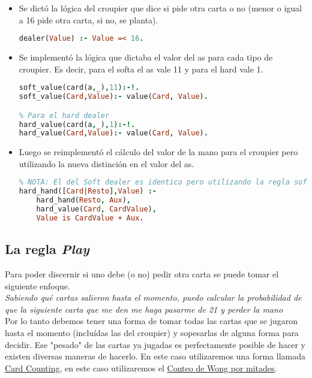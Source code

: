 \documentclass[12pt]{report}
\begin{document}
\begin{itemize}
    \item Se dictó la lógica del croupier que dice si pide otra carta o no (menor o igual a 16 pide otra carta, si no, se planta).
\begin{lstlisting}[language=Prolog]
dealer(Value) :- Value =< 16.
\end{lstlisting}
    \item Se implementó la lógica que dictaba el valor del as para cada tipo de croupier. Es decir, para el softa el as vale 11 y para el hard vale 1.
\begin{lstlisting}[language=Prolog]
% Para el soft dealer
soft_value(card(a,_),11):-!.
soft_value(Card,Value):- value(Card, Value).

% Para el hard dealer
hard_value(card(a,_),1):-!.
hard_value(Card,Value):- value(Card, Value).
\end{lstlisting}
    \item Luego se reimplementó el cálculo del valor de la mano para el croupier pero utilizando la nueva distinción en el valor del as.
\begin{lstlisting}[language=Prolog]
% Hard dealer
% NOTA: El del Soft dealer es identico pero utilizando la regla soft_value en lugar de hard_value
hard_hand([Card|Resto],Value) :- 
    hard_hand(Resto, Aux), 
    hard_value(Card, CardValue),
    Value is CardValue + Aux.
\end{lstlisting}
\end{itemize}

\subsection*{La regla \textit{Play}}

Para poder discernir si uno debe (o no) pedir otra carta se puede tomar el siguiente enfoque.\\

\textit{Sabiendo qué cartas salieron hasta el momento, puedo calcular la probabilidad de que la siguiente carta que me den me haga pasarme de 21 y perder la mano}\\

Por lo tanto debemos tener una forma de tomar todas las cartas que se jugaron hasta el momento (incluídas las del croupier) y sopesarlas de alguna forma para decidir. Ese "pesado" de las cartas ya jugadas es perfectamente posible de hacer y existen diversas maneras de hacerlo. En este caso utilizaremos una forma llamada \href{https://en.wikipedia.org/wiki/Card_counting}{Card Counting}, en este caso utilizaremos el \href{http://www.gamesblackjack.org/strategy/card-counting/wong-halves-count.php}{Conteo de Wong por mitades}.
\end{document}

